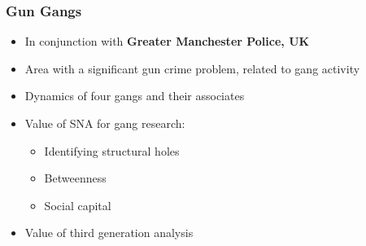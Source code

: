 \documentclass[pdftex]{beamer}
\begin{document}
{ %
    \begin{frame}[plain]
     \end{frame}
}

\begin{frame}
\frametitle{Gun Gangs}
\begin{itemize}
\item In conjunction with {\textbf{Greater Manchester Police, UK}}
\item Area with a significant gun crime problem, related to gang activity
\item Dynamics of four gangs and their associates
\item Value of SNA for gang research:
\begin{itemize}
\item Identifying structural holes
\item Betweenness
\item Social capital
\end{itemize}
\item Value of third generation analysis
\end{itemize}
\end{frame}

\end{document}
